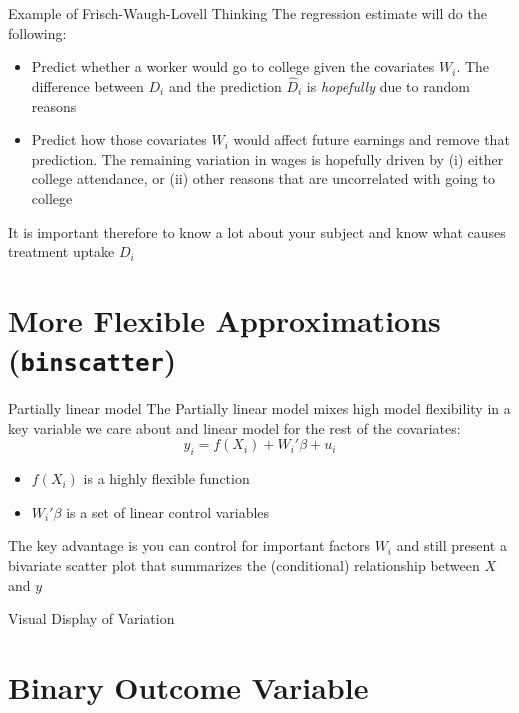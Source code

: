 \documentclass[aspectratio=169,t,11pt,table]{beamer}
\begin{document}
\begin{frame}{Example of Frisch-Waugh-Lovell Thinking}
  The regression estimate will do the following:
  \begin{itemize}
    \item Predict whether a worker would go to college given the covariates $W_i$. The difference between $D_i$ and the prediction $\hat{D}_i$ is \emph{hopefully} due to random reasons
    
    \item Predict how those covariates $W_i$ would affect future earnings and remove that prediction. The remaining variation in wages is hopefully driven by (i) either college attendance, or (ii) other reasons that are uncorrelated with going to college
  \end{itemize}

  \bigskip
  It is important therefore to know a lot about your subject and know what causes treatment uptake $D_i$
\end{frame}





\section{More Flexible Approximations (\texttt{binscatter})}

\begin{frame}{Partially linear model}
  The \alert{Partially linear model} mixes high model flexibility in a key variable we care about and linear model for the rest of the covariates:
  $$
    y_i = f(X_i) + W_i' \beta + u_i
  $$
  \begin{itemize}
    \item $f(X_i)$ is a highly flexible function
    \item $W_i' \beta$ is a set of linear control variables
  \end{itemize}

  \bigskip
  The key advantage is you can control for important factors $W_i$ and still present a bivariate scatter plot that summarizes the (conditional) relationship between $X$ and $y$
\end{frame}

\begin{frame}{Visual Display of Variation}

\end{frame}




\section{Binary Outcome Variable}
\end{document}
